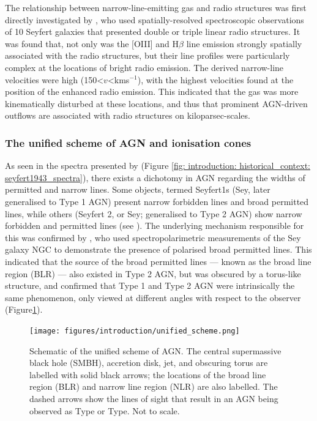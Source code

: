 The relationship between narrow-line-emitting gas and radio structures was first directly investigated by \citet{Whittle1988}, who used spatially-resolved spectroscopic observations of 10 Seyfert galaxies that presented double or triple linear radio structures. It was found that, not only was the [OIII] and H$\beta$ line emission strongly spatially associated with the radio structures, but their line profiles were particularly complex at the locations of bright radio emission. The derived narrow-line velocities were high (150\;\textless\;$v$\;\textless{}\;km\;s$^{-1}$), with the highest velocities found at the position of the enhanced radio emission. This indicated that the gas was more kinematically disturbed at these locations, and thus that prominent AGN-driven outflows are associated with radio structures on kiloparsec-scales.

\subsubsection{The unified scheme of AGN and ionisation cones}
\label{section: introduction: historical_context: nlr_studies: unified scheme}

As seen in the spectra presented by \citet{Seyfert1943} (Figure \ref{fig: introduction: historical_context: seyfert1943_spectra}), there exists a dichotomy in AGN regarding the widths of permitted and narrow lines. Some objects, termed Seyfert\;1s (Sey, later generalised to Type 1 AGN) present narrow forbidden lines and broad permitted lines, while others (Seyfert 2, or Sey; generalised to Type 2 AGN) show narrow forbidden and permitted lines (see \citealt{Khachikian1971}). The underlying mechanism responsible for this was confirmed by \citet{Antonucci1985}, who used spectropolarimetric measurements of the Sey galaxy NGC to demonstrate the presence of polarised broad permitted lines. This indicated that the source of the broad permitted lines --- known as the broad line region (BLR) --- also existed in Type 2 AGN, but was obscured by a torus-like structure, and confirmed that Type 1 and Type 2 AGN were intrinsically the same phenomenon, only viewed at different angles with respect to the observer (Figure\;\ref{fig: introduction: historical_context: nlr_studies: unified_scheme}).

\begin{figure}[!ht]
    \centering
    \texttt{[image: figures/introduction/unified\_scheme.png]}
    \caption[Schematic of the unified scheme of AGN.]{Schematic of the unified scheme of AGN. The central supermassive black hole (SMBH), accretion disk, jet, and obscuring torus are labelled with solid black arrows; the locations of the broad line region (BLR) and narrow line region (NLR) are also labelled. The dashed arrows show the lines of sight that result in an AGN being observed as Type or Type. Not to scale.}
    \label{fig: introduction: historical_context: nlr_studies: unified_scheme}
\end{figure}

